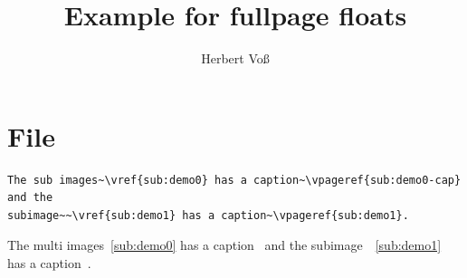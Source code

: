 \documentclass{scrartcl}
\begin{document}
\title{Example for fullpage floats}
\author{Herbert Voß}
\maketitle

\tableofcontents

\blinddocument

\section{File \texttt{\jobname}}

\begin{lstlisting}
The sub images~\vref{sub:demo0} has a caption~\vpageref{sub:demo0-cap} and the
subimage~~\vref{sub:demo1} has a caption~\vpageref{sub:demo1}.
\end{lstlisting}

The multi images~\vref{sub:demo0} has a caption~ and the
subimage~~\vref{sub:demo1} has a caption~.
\end{document}
